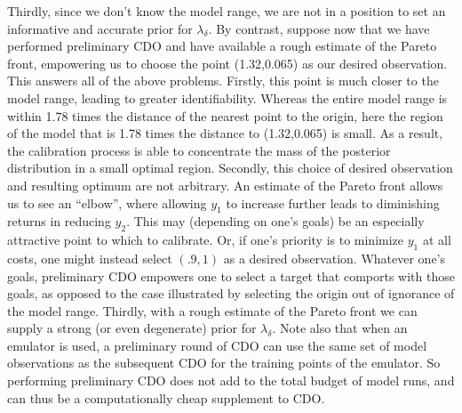 \documentclass[12pt]{article}
\begin{document}
%
Thirdly, since we don't know the model range, we are not in a position to set an informative and accurate prior for $\lambda_\delta$.
%
By contrast, suppose now that we have performed preliminary CDO and have available a rough estimate of the Pareto front, empowering us to choose the point (1.32,0.065) as our desired observation.
%
This answers all of the above problems.
%
Firstly, this point is much closer to the model range, leading to greater identifiability.
%
Whereas the entire model range is within 1.78 times the distance of the nearest point to the origin, here the region of the model that is 1.78 times the distance to (1.32,0.065) is small.
%
As a result, the calibration process is able to concentrate the mass of the posterior distribution in a small optimal region.
%
Secondly, this choice of desired observation and resulting optimum are not arbitrary.
%
An estimate of the Pareto front allows us to see an ``elbow'', where allowing $y_1$ to increase further leads to diminishing returns in reducing $y_2$.
%
This may (depending on one's goals) be an especially attractive point to which to calibrate.
%
Or, if one's priority is to minimize $y_1$ at all costs, one might instead select $(.9,1)$ as a desired observation.
%
Whatever one's goals, preliminary CDO empowers one to select a target that comports with those goals, as opposed to the case illustrated by selecting the origin out of ignorance of the model range.
%
Thirdly, with a rough estimate of the Pareto front we can supply a strong (or even degenerate) prior for $\lambda_\delta$.
%
Note also that when an emulator is used, a preliminary round of CDO can use the same set of model observations as the subsequent CDO for the training points of the emulator.
%
So performing preliminary CDO does not add to the total budget of model runs, and can thus be a computationally cheap supplement to CDO.
\end{document}
